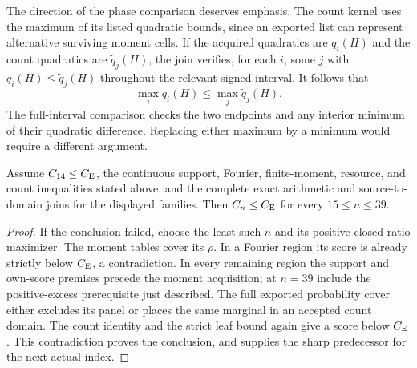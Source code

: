 The direction of the phase comparison deserves emphasis. The count
kernel uses the maximum of its listed quadratic bounds, since an
exported list can represent alternative surviving moment cells.
If the acquired quadratics are $q_i(H)$ and the count quadratics are
$\widetilde q_j(H)$, the join verifies, for each $i$, some $j$ with
$q_i(H)\le\widetilde q_j(H)$ throughout the relevant signed interval.
It follows that
\[
 \max_i q_i(H)\le\max_j\widetilde q_j(H).
\]
The full-interval comparison checks the two endpoints and any interior
minimum of their quadratic difference. Replacing either maximum by a
minimum would require a different argument.

\begin{proposition}\label{ext:finite1539-assembly}
Assume $C_{14}\le C_{\mathrm E}$, the continuous support, Fourier, finite-moment,
resource, and count inequalities stated above, and the complete exact
arithmetic and source-to-domain joins for the displayed families.
Then $C_n\le C_{\mathrm E}$ for every $15\le n\le39$.
\end{proposition}
\begin{proof}
If the conclusion failed, choose the least such $n$ and its positive
closed ratio maximizer. The moment tables cover its $\rho$. In a
Fourier region its score is already strictly below $C_{\mathrm E}$, a
contradiction. In every remaining region the support and own-score
premises precede the moment acquisition; at $n=39$ include the
positive-excess prerequisite just described. The full exported
probability cover either excludes its panel or places the same
marginal in an accepted count domain. The count identity and the
strict leaf bound again give a score below $C_{\mathrm E}$. This contradiction
proves the conclusion, and supplies the sharp predecessor for the
next actual index.
\end{proof}
